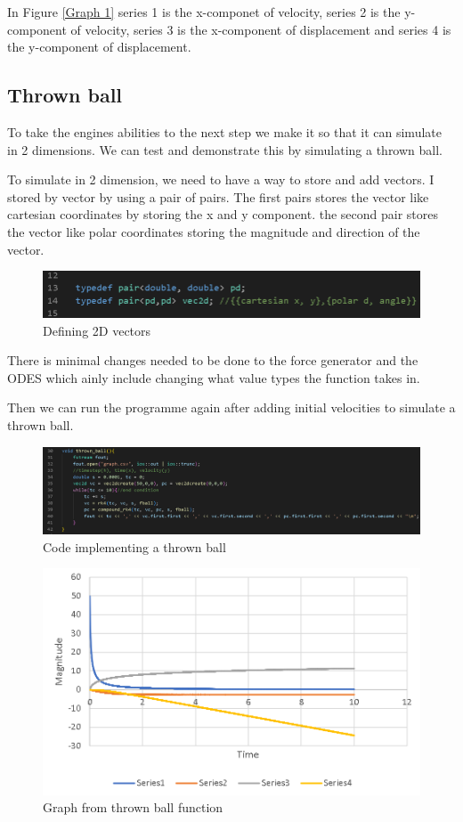 \documentclass[12pt, a2paper]{article}
\begin{document}
In Figure \ref{Graph 1} series 1 is the x-componet of velocity, series 2 is the y-component of velocity, series 3 is the x-component of displacement and series 4 is the y-component of displacement.
\pagebreak

\subsection{Thrown ball}
To take the engines abilities to the next step we make it so that it can simulate in 2 dimensions. We can test and demonstrate this by simulating a thrown ball.

To simulate in 2 dimension, we need to have a way to store and add vectors. I stored by vector by using a pair of pairs. The first pairs stores the vector like cartesian coordinates by storing the x and y component. the second pair stores the vector like polar coordinates storing the magnitude and direction of the vector.
\begin{figure}[h]
\center
\includegraphics[width = 1\textwidth]{vec2d definition}
\caption{Defining 2D vectors}
\label{fig 2}
\end{figure}
\pagebreak

There is minimal changes needed to be done to the force generator and the ODES which ainly include changing what value types the function takes in.

Then we can run the programme again after adding initial velocities to simulate a thrown ball.
\begin{figure}[h]
\center
\includegraphics[width=1\textwidth]{thrown ball function}
\caption{Code implementing a thrown ball}
\label{fig 3}
\end{figure}
\begin{figure}[h]
\center
\includegraphics[width=1\textwidth]{thrown ball graph}
\caption{Graph from thrown ball function}
\label{Graph 2}
\end{figure}
\end{document}
